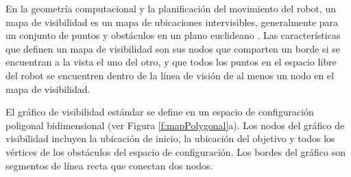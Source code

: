 
En la geometría computacional y la planificación del movimiento del 
robot, un mapa de visibilidad es un mapa de ubicaciones intervisibles, 
generalmente para un conjunto de puntos y obstáculos en un plano 
euclideano \cite{wikiVisibilityGraph}. Las características que definen 
un mapa de visibilidad son sus nodos que comparten un borde si se encuentran 
a la vista el uno del otro, y que todos los puntos en el espacio libre del 
robot se encuentren dentro de la línea de visión de al menos un nodo 
en el mapa de visibilidad. 

El gráfico de visibilidad estándar se define en un espacio de 
configuración poligonal bidimensional (ver Figura \ref{f:mapPolygonal}a). Los 
nodos del gráfico de visibilidad incluyen la ubicación de inicio, la ubicación 
del objetivo y todos los vértices de los obstáculos del espacio de 
configuración. Los bordes del gráfico  son segmentos de línea recta que 
conectan dos nodos.


